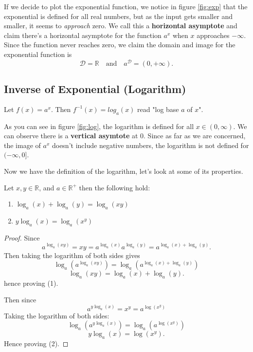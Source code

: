 \documentclass[11pt]{article}
\numberwithin{lemma}{section}
\numberwithin{equation}{section}
\numberwithin{define}{section}
\numberwithin{prop}{section}
\numberwithin{figure}{section}
\numberwithin{theorem}{section}
\numberwithin{cor}{section}
\newcounter{ex}[section]
\numberwithin{ex}{section}
\def\real{\mathbb{R}}
\def\jand{\quad\text{and}\quad}
\begin{document}
If we decide to plot the exponential function, we notice in figure \eqref{fig:exp} that the exponential is defined for all real numbers, but as the input gets smaller and smaller, it seems to \textit{approach} zero. We call this a \textbf{horizontal asymptote} and claim there's a horizontal asymptote for the function $a^x$ when $x$ approaches $-\infty$. Since the function never reaches zero, we claim the domain and image for the exponential function is
$$\mathcal{D}=\real \jand a^\mathcal{D}=(0,+\infty).$$

\subsection{Inverse of Exponential (Logarithm)}
\begin{define}
	Let $f(x)=a^x$. Then $f^{-1}(x)=log_a(x)$ read "log base $a$ of $x$".\footnotemark
\end{define}
\begin{figure}[h]
	\centering
	\caption{}
	\label{fig:log}
\end{figure}
As you can see in figure \eqref{fig:log}, the logarithm is defined for all $x\in(0,\infty)$. We can observe there is a \textbf{vertical asymtote} at $0$.
Since as far as we are concerned, the image of $a^x$ doesn't include negative numbers, the logarithm is not defined for $(-\infty,0]$.

Now we have the definition of the logarithm, let's look at some of its properties.
\begin{theorem}
	Let $x,y\in\real$, and $a\in\real^{+}$ then the following hold:
	\begin{enumerate}
		\item $\log_a(x)+\log_a(y)=\log_a(xy)$
		\item $y\log_a(x)=\log_a(x^y)$
	\end{enumerate}
\end{theorem}
\begin{proof}
	Since
	$$a^{\log_a(xy)}=xy=a^{\log_a(x)}a^{\log_a(y)}=a^{\log_a(x)+\log_a(y)}.$$
	Then taking the logarithm of both sides gives
	$$\log_a(a^{\log_a(xy)})=\log_a(a^{\log_a(x)+\log_a(y)})$$
	$$\log_a(xy)=\log_a(x)+\log_a(y).$$
	hence proving (1).

	Then since
	$$a^{y\log_a(x)}=x^y=a^{\log(x^y)}$$
	Taking the logarithm of both sides:
	$$\log_a(a^{y\log_a(x)})=\log_a(a^{\log(x^y)})$$
	$$y\log_a(x)=\log(x^y).$$
	Hence proving (2).
\end{proof}
\end{document}
